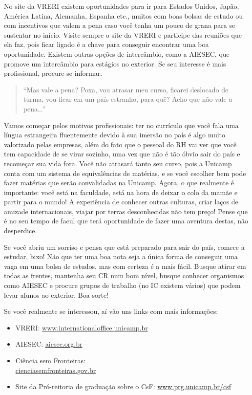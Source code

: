 No site da VRERI existem oportunidades para ir para Estados Unidos, Japão,
América Latina, Alemanha, Espanha etc., muitos com boas bolsas de estudo ou com
incentivos que valem a pena caso você tenha um pouco de grana para se sustentar
no início. Visite sempre o site da VRERI e participe das reuniões que ela faz,
pois ficar ligado é a chave para conseguir encontrar uma boa
oportunidade. Existem outras opções de intercâmbio, como a AIESEC, que promove
um intercâmbio para estágios no exterior. Se seu interesse é mais profissional,
procure se informar.

\begin{quote}
``Mas vale a pena? Poxa, vou atrasar meu curso, ficarei deslocado de turma, vou
ficar em um país estranho, para quê? Acho que não vale a pena{\dots}''
\end{quote}
Vamos começar pelos motivos profissionais: ter no currículo que você fala uma
língua estrangeira fluentemente devido à sua imersão no país é algo muito
valorizado pelas empresas, além do fato que o pessoal do RH vai ver que você tem
capacidade de se virar sozinho, uma vez que não é tão óbvio sair do país e
recomeçar sua vida fora. Você não atrasará tanto seu curso, pois a Unicamp conta
com um sistema de equivalências de matérias, e se você escolher bem pode fazer
matérias que serão convalidadas na Unicamp. Agora, o que realmente é importante:
você está na faculdade, está na hora de deixar o colo da mamãe e partir para o
mundo! A experiência de conhecer outras culturas, criar laços de amizade
internacionais, viajar por terras desconhecidas não tem preço! Pense que é no
seu tempo de facul que terá oportunidade de fazer uma aventura destas, não
desperdice.

Se você abriu um sorriso e pensa que está preparado para sair do país, comece a
estudar, bixo! Não que ter uma boa nota seja a única forma de conseguir uma vaga
em uma bolsa de estudos, mas com certeza é a mais fácil.  Busque atirar em todas
as frentes, mantenha seu CR num bom nível, busque conhecer organismos como
AIESEC e procure grupos de trabalho (no IC existem vários) que podem levar
alunos ao exterior. Boa sorte!

Se você realmente se interessou, aí vão uns links com mais informações:

\begin{itemize}
    \item  VRERI: \url{www.internationaloffice.unicamp.br}
    \item  AIESEC: \url{aiesec.org.br}
    \item  Ciência sem Fronteiras: \\\url{cienciasemfronteiras.gov.br}
    \item  Site da Pró-reitoria de graduação sobre o CsF: \url{www.prg.unicamp.br/csf}
\end{itemize}

